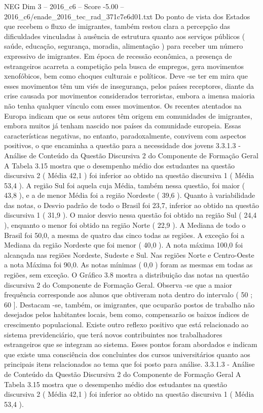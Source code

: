 \begin{textsample}{NEG Dim 3 – 2016\_c6 – Score -5.00 – 2016\_c6/enade\_2016\_tec\_rad\_371c7e6d01.txt}
Do ponto de vista dos Estados que recebem o fluxo de imigrantes, também restou clara a percepção das dificuldades vinculadas à ausência de estrutura quanto aos serviços públicos ( saúde, educação, segurança, moradia, alimentação ) para receber um número expressivo de imigrantes.
Em época de recessão econômica, a presença de estrangeiros acarreta a competição pela busca de empregos, gera movimentos xenofóbicos, bem como choques culturais e políticos.
Deve -se ter em mira que esses movimentos têm um viés de insegurança, pelos países receptores, diante da crise causada por movimentos considerados terroristas, embora a imensa maioria não tenha qualquer vínculo com esses movimentos.
Os recentes atentados na Europa indicam que os seus autores têm origem em comunidades de imigrantes, embora muitos já tenham nascido nos países da comunidade europeia.
Essas características negativas, no entanto, paradoxalmente, convivem com aspectos positivos, o que encaminha a questão para a necessidade dos jovens 3.3.1.3 - Análise de Conteúdo da Questão Discursiva 2 do Componente de Formação Geral A Tabela 3.15 mostra que o desempenho médio dos estudantes na questão discursiva 2 ( Média 42,1 ) foi inferior ao obtido na questão discursiva 1 ( Média 53,4 ).
A região Sul foi aquela cuja Média, também nessa questão, foi maior ( 43,8 ), e a de menor Média foi a região Nordeste ( 39,6 ).
Quanto à variabilidade das notas, o Desvio padrão de todo o Brasil foi 23,7, inferior ao obtido na questão discursiva 1 ( 31,9 ).
O maior desvio nessa questão foi obtido na região Sul ( 24,4 ), enquanto o menor foi obtido na região Norte ( 22,9 ).
A Mediana de todo o Brasil foi 50,0, a mesma de quatro das cinco todas as regiões.
A exceção foi a Mediana da região Nordeste que foi menor ( 40,0 ).
A nota máxima 100,0 foi alcançada nas regiões Nordeste, Sudeste e Sul.
Nas regiões Norte e Centro-Oeste a nota Máxima foi 90,0.
As notas mínimas ( 0,0 ) foram as mesmas em todas as regiões, sem exceção.
O Gráfico 3.8 mostra a distribuição das notas na questão discursiva 2 do Componente de Formação Geral.
Observa -se que a maior frequência corresponde aos alunos que obtiveram nota dentro do intervalo ( 50 ; 60 ].
Destacam -se, também, os imigrantes, que ocuparão postos de trabalho não desejados pelos habitantes locais, bem como, compensarão os baixos índices de crescimento populacional.
Existe outro reflexo positivo que está relacionado ao sistema previdenciário, que terá novos contribuintes nos trabalhadores estrangeiros que se integram ao sistema.
Esses pontos foram abordados e indicam que existe uma consciência dos concluintes dos cursos universitários quanto aos principais itens relacionados ao tema que foi posto para análise. 3.3.1.3 - Análise de Conteúdo da Questão Discursiva 2 do Componente de Formação Geral A Tabela 3.15 mostra que o desempenho médio dos estudantes na questão discursiva 2 ( Média 42,1 ) foi inferior ao obtido na questão discursiva 1 ( Média 53,4 ).

\end{textsample}
